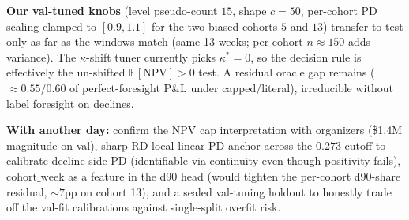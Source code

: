 \documentclass[11pt]{article}
\newcommand{\E}{\mathbb{E}}
\newcommand{\NPV}{\mathrm{NPV}}
\begin{document}
\textbf{Our val-tuned knobs} (level pseudo-count $15$, shape $c{=}50$, per-cohort PD
scaling clamped to $[0.9,1.1]$ for the two biased cohorts $5$ and $13$) transfer to test
only as far as the windows match (same 13 weeks; per-cohort $n\approx150$ adds variance).
The $\kappa$-shift tuner currently picks $\kappa^* = 0$, so the decision rule is
effectively the un-shifted $\E[\NPV] > 0$ test. A residual oracle gap remains
($\approx 0.55$/$0.60$ of perfect-foresight P\&L under capped/literal), irreducible
without label foresight on declines.

\textbf{With another day:} confirm the NPV cap interpretation with organizers (\$1.4M
magnitude on val), sharp-RD local-linear PD anchor across the $0.273$ cutoff to calibrate
decline-side PD (identifiable via continuity even though positivity fails),
$\text{cohort\_week}$ as a feature in the d90 head (would tighten the per-cohort
d90-share residual, $\sim7$pp on cohort 13), and a sealed val-tuning holdout to
honestly trade off the val-fit calibrations against single-split overfit risk.
\end{document}
